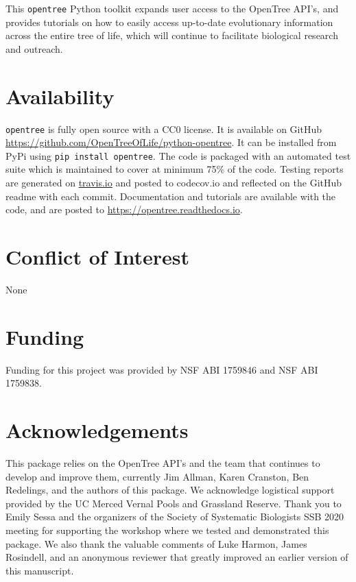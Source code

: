 \documentclass[oupdraft]{sysbio_sse}
\begin{document}

This \texttt{opentree} Python toolkit expands user access to the OpenTree API's, and provides tutorials on how to easily access up-to-date evolutionary information across the entire tree of life, which will continue to facilitate biological research and outreach.


\section{Availability}
\label{sec6}

\texttt{opentree} is fully open source with a CC0 license. It is available on GitHub \url{ https://github.com/OpenTreeOfLife/python-opentree}. It can be installed from PyPi using \texttt{pip install opentree}. The code is packaged with an automated test suite which is maintained to cover at minimum 75\% of the code. Testing reports are generated on \url{travis.io} and posted to {codecov.io} and reflected on the GitHub readme with each commit. Documentation and tutorials are available with the code, and are posted to \url{https://opentree.readthedocs.io}.


\section{Conflict of Interest}
None

\section{Funding}
Funding for this project was provided by NSF ABI 1759846 and NSF ABI 1759838.

\section{Acknowledgements}
This package relies on the OpenTree API's and the team that continues to develop and improve them, currently Jim Allman, Karen Cranston, Ben Redelings, and the authors of this package. We acknowledge logistical support provided by the UC Merced Vernal Pools and Grassland Reserve.
Thank you to Emily Sessa and the organizers of the Society of Systematic Biologists SSB 2020 meeting for supporting the workshop where we tested and demonstrated this package.
We also thank the valuable comments of Luke Harmon, James Rosindell,
and an anonymous reviewer that greatly improved an earlier version of this manuscript.
\end{document}
